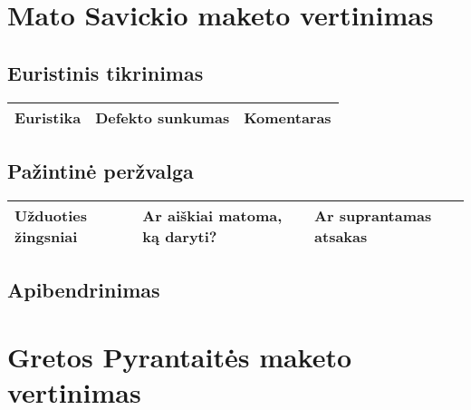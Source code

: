 \documentclass[oneside]{VUMIFPSkursinis}
\begin{document}
\section{Mato Savickio maketo vertinimas}
	\subsection{Euristinis tikrinimas}
\begin{center}
    \begin{tabular}{ |p{3cm}| p{3cm} | p{11cm} | }
    \hline
    Euristika &Defekto sunkumas &Komentaras \\ \hline 
   \hline
    \end{tabular}
\end{center}
	\subsection{Pažintinė peržvalga}
\begin{center}
    \begin{tabular}{ |p{4cm}| p{6cm} | p{7cm} | }
    \hline
    Užduoties žingsniai & Ar aiškiai matoma, ką daryti? & Ar suprantamas atsakas \\ \hline 
   \hline
    \end{tabular}
\end{center}
	\subsection{Apibendrinimas}
\iffalse XXXXXXXXXXXXXXXXXXXXXXXXXXXXXXXXXXXXXXXXXXXXXXXXXXXXXXXXXXXXXXXXXXXXXXXXXXXXXXXXXXXXXXXXXXXXXXXXXXXXXXXXXXXXXXXXXXXXXXXXXXXXXXXXXXXXXXX \fi
\section{Gretos Pyrantaitės maketo vertinimas}
\end{document}
